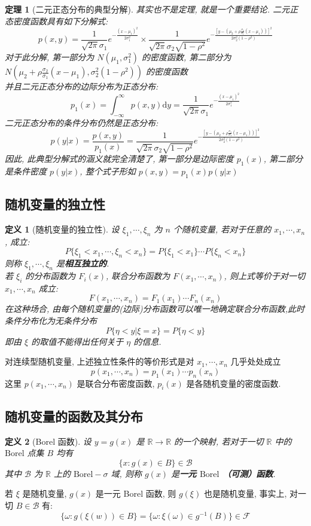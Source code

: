 \documentclass[12pt,a4paper]{article}
\newtheorem{thm}{定理}[subsection]  %
\newtheorem{definition}{定义}[subsection] %
\begin{document}
\begin{thm}[二元正态分布的典型分解]
    其实也不是定理, 就是一个重要结论. 二元正态密度函数具有如下分解式:
    \[p(x,y) = \frac{1}{\sqrt{2\pi}\sigma_1} e^{-\frac{(x-\mu_1)^2}{2\sigma_1^2}} \times \frac{1}{\sqrt{2\pi}\sigma_2\sqrt{1-\rho^2}}e^{- \frac{\left[ y-\left(\mu_2+\rho \frac{\sigma_2}{\sigma_1}(x-\mu_1) \right)\right]^2}{2\sigma_2^2(1-\rho^2)} } \]
    对于此分解, 第一部分为 $N(\mu_1, \sigma_1^2)$ 的密度函数, 第二部分为 $N\left(\mu_2+\rho \frac{\sigma_2}{\sigma_1}(x-\mu_1),\sigma_2^2(1-\rho^2)\right)$ 的密度函数\\
    并且二元正态分布的边际分布为正态分布:
    \[p_1(x) = \int_{-\infty}^{\infty} p(x,y) \mathrm{d}y = \frac{1}{\sqrt{2\pi} \sigma_1} e^{-\frac{(x-\mu_1)^2}{2\sigma_1^2}}\]
    二元正态分布的条件分布仍然是正态分布:
    \[p(y|x) = \frac{p(x,y)}{p_1(x)} = \frac{1}{\sqrt{2\pi}\sigma_2\sqrt{1-\rho^2}}e^{- \frac{\left[ y-\left(\mu_2+\rho \frac{\sigma_2}{\sigma_1}(x-\mu_1) \right)\right]^2}{2\sigma_2^2(1-\rho^2)} }\]
    因此, 此典型分解式的涵义就完全清楚了, 第一部分是边际密度 $p_1(x)$, 第二部分是条件密度 $p(y|x)$, 整个式子形如 $p(x,y) = p_1(x) p(y|x)$
\end{thm}
\subsection{随机变量的独立性}
\begin{definition}[随机变量的独立性]
    设 $\xi_1, \cdots, \xi_n$ 为 $n$ 个随机变量, 若对于任意的 $x_1, \cdots, x_n$, 成立:
    \[P\{\xi_1<x_1, \cdots, \xi_n<x_n \} = P\{\xi_1<x_1\}\cdots P\{\xi_n<x_n\} \]
    则称 $\xi_1, \cdots, \xi_n$ 是\textbf{相互独立的}.\\
    若 $\xi_i$ 的分布函数为 $F_i(x)$, 联合分布函数为 $F(x_1, \cdots, x_n)$, 则上式等价于对一切 $x_1, \cdots, x_n$ 成立:
    \[F(x_1, \cdots, x_n) = F_1(x_1) \cdots F_n(x_n)\]
    在这种场合, 由每个随机变量的(边际)分布函数可以唯一地确定联合分布函数,此时条件分布化为无条件分布
    \[P\{\eta < y | \xi =x\} = P\{\eta < y\}\]
    即由 $\xi$ 的取值不能得出任何关于 $\eta$ 的信息.
\end{definition}
对连续型随机变量, 上述独立性条件的等价形式是对 $x_1, \cdots, x_n$ 几乎处处成立
\[p(x_1, \cdots, x_n) = p_1(x_1) \cdots p_n (x_n)\]
这里 $p(x_1, \cdots, x_n)$ 是联合分布密度函数, $p_i(x)$ 是各随机变量的密度函数.
\subsection{随机变量的函数及其分布}
\begin{definition}[Borel 函数]
    设 $y = g(x)$ 是 $\mathbb{R} \to \mathbb{R}$ 的一个映射, 若对于一切 $\mathbb{R}$ 中的 $\mathrm{Borel}$ 点集 $B$ 均有 
    \[\{x:g(x) \in B\} \in \mathscr{B}\]其中 $\mathscr{B}$ 为 $\mathbb{R}$ 上的 $\mathrm{Borel}-\sigma$ 域, 
    则称 $g(x)$ 是\textbf{一元 $\mathrm{Borel}$ （可测）函数}.
\end{definition}
若 $\xi$ 是随机变量, $g(x)$ 是一元 Borel 函数, 则 $g(\xi)$ 也是随机变量, 事实上, 对一切 $B \in \mathscr{B}$ 有:
\[\{\omega:g(\xi(w)) \in B\} = \{\omega: \xi(\omega) \in g^{-1}(B)\} \in \mathscr{F}\]
\end{document}
